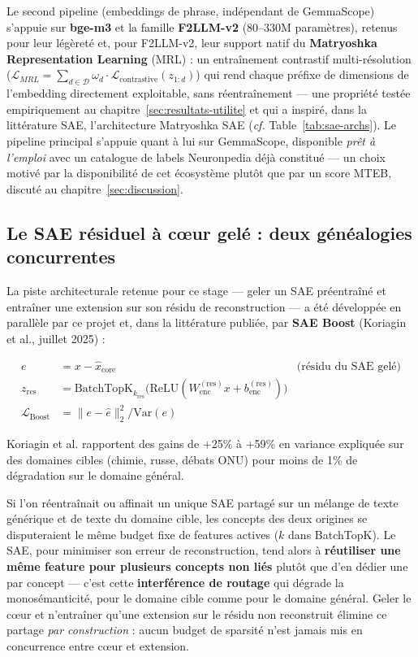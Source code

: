 \documentclass[11pt]{article}
\newcommand{\Var}{\mathrm{Var}}
\begin{document}
Le second pipeline (embeddings de phrase, indépendant de GemmaScope) s'appuie
sur \textbf{bge-m3} et la famille \textbf{F2LLM-v2} (80--330M paramètres),
retenus pour leur légèreté et, pour F2LLM-v2, leur support natif du
\textbf{Matryoshka Representation Learning} (MRL) \cite{kusupati2022mrl} : un
entraînement contrastif multi-résolution
($\mathcal{L}_{MRL} = \sum_{d \in \mathcal{D}} \omega_d \cdot
\mathcal{L}_\text{contrastive}(z_{1:d})$) qui rend chaque préfixe de
dimensions de l'embedding directement exploitable, sans réentraînement --- une
propriété testée empiriquement au chapitre~\ref{sec:resultats-utilite} et qui a
inspiré, dans la littérature SAE, l'architecture Matryoshka SAE (\emph{cf.}
Table~\ref{tab:sae-archs}). Le pipeline principal s'appuie quant à lui sur
GemmaScope, disponible \emph{prêt à l'emploi} avec un catalogue de labels
Neuronpedia déjà constitué --- un choix motivé par la disponibilité de cet
écosystème plutôt que par un score MTEB, discuté au
chapitre~\ref{sec:discussion}.

\subsection{Le SAE résiduel à cœur gelé : deux généalogies concurrentes}
\label{subsec:sae-boost-litt}

La piste architecturale retenue pour ce stage --- geler un SAE préentraîné et
entraîner une extension sur son résidu de reconstruction --- a été développée
en parallèle par ce projet et, dans la littérature publiée, par
\textbf{SAE Boost} \cite{koriagin2025saeboost} (Koriagin et al., juillet 2025) :

\begin{align*}
  e &= x - \hat{x}_\text{core} & \text{(résidu du SAE gelé)} \\
  z_\text{res} &= \text{BatchTopK}_{k_\text{res}}\bigl(\text{ReLU}(W_\text{enc}^{(\text{res})} x + b_\text{enc}^{(\text{res})})\bigr) \\
  \mathcal{L}_\text{Boost} &= \|e - \hat{e}\|_2^2 / \Var(e)
\end{align*}

Koriagin et al. rapportent des gains de +25\% à +59\% en variance expliquée
sur des domaines cibles (chimie, russe, débats ONU) pour moins de 1\% de
dégradation sur le domaine général.

\begin{definitionbox}
Si l'on réentraînait ou affinait un unique SAE partagé sur un mélange de texte
générique et de texte du domaine cible, les concepts des deux origines se
disputeraient le même budget fixe de features actives ($k$ dans BatchTopK).
Le SAE, pour minimiser son erreur de reconstruction, tend alors à
\textbf{réutiliser une même feature pour plusieurs concepts non liés} plutôt
que d'en dédier une par concept --- c'est cette \textbf{interférence de
routage} qui dégrade la monosémanticité, pour le domaine cible comme pour le
domaine général. Geler le cœur et n'entraîner qu'une extension sur le résidu
non reconstruit élimine ce partage \emph{par construction} : aucun budget de
sparsité n'est jamais mis en concurrence entre cœur et extension.
\end{definitionbox}
\end{document}
